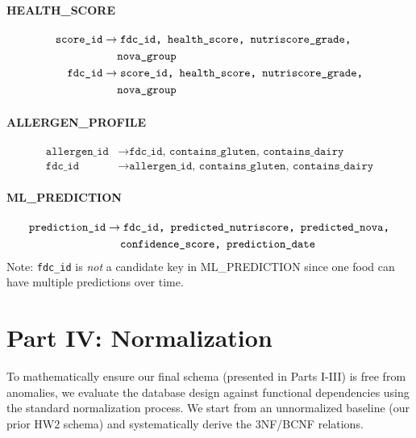 \documentclass[12pt,a4paper]{article}
\begin{document}
\begin{fdbox}
\paragraph{HEALTH\_SCORE}
\begin{align}
\texttt{score\_id} &\to \texttt{fdc\_id, health\_score, nutriscore\_grade,} \notag \\
                   &\quad\; \texttt{nova\_group} \\
\texttt{fdc\_id} &\to \texttt{score\_id, health\_score, nutriscore\_grade,} \notag \\
                 &\quad\; \texttt{nova\_group}
\end{align}

\paragraph{ALLERGEN\_PROFILE}
\begin{align}
\texttt{allergen\_id} &\to \texttt{fdc\_id, contains\_gluten, contains\_dairy} \\
\texttt{fdc\_id} &\to \texttt{allergen\_id, contains\_gluten, contains\_dairy}
\end{align}

\paragraph{ML\_PREDICTION}
\begin{align}
\texttt{prediction\_id} &\to \texttt{fdc\_id, predicted\_nutriscore, predicted\_nova,} \notag \\
                        &\quad\; \texttt{confidence\_score, prediction\_date}
\end{align}
Note: \texttt{fdc\_id} is \emph{not} a candidate key in ML\_PREDICTION since one food can have multiple predictions over time.
\end{fdbox}

\section{Part IV: Normalization}

To mathematically ensure our final schema (presented in Parts I-III) is free from anomalies, we evaluate the database design against functional dependencies using the standard normalization process. We start from an unnormalized baseline (our prior HW2 schema) and systematically derive the 3NF/BCNF relations.
\end{document}
